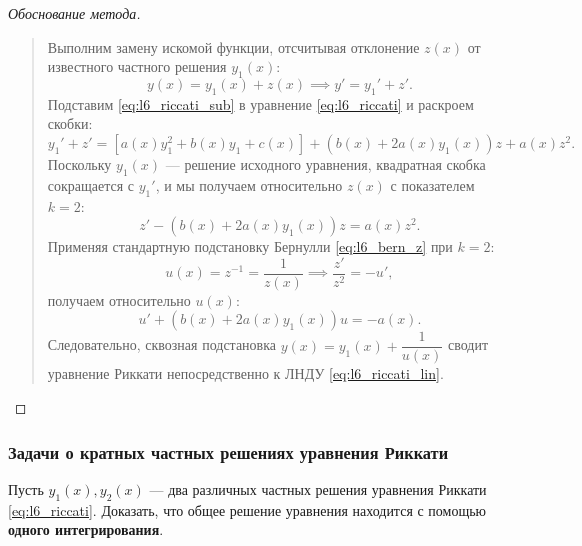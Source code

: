 \begin{proof}[Обоснование метода]~\\
    \begin{quote}
        Выполним замену искомой функции, отсчитывая отклонение $z(x)$ от
        известного частного решения $y_1(x)$:
        \begin{equation} \label{eq:l6_riccati_sub}
            y(x) = y_1(x) + z(x) \implies y' = y_1' + z'. \tag{14}
        \end{equation}
        Подставим \eqref{eq:l6_riccati_sub} в уравнение \eqref{eq:l6_riccati} и
        раскроем скобки:
        \[
            y_1' + z' = \left[a(x) y_1^2 + b(x) y_1 + c(x)\right] +
            \left(b(x) + 2 a(x) y_1(x)\right) z + a(x) z^2.
        \]
        Поскольку $y_1(x)$ — решение исходного уравнения, квадратная скобка
        сокращается с $y_1'$, и мы получаем 
        относительно $z(x)$ с показателем $k = 2$:
        \begin{equation} \label{eq:l6_riccati_bern}
            z' - \left(b(x) + 2 a(x) y_1(x)\right) z = a(x) z^2. \tag{15}
        \end{equation}
        Применяя стандартную подстановку Бернулли \eqref{eq:l6_bern_z} при
        $k = 2$:
        \begin{equation} \label{eq:l6_riccati_u}
            u(x) = z^{-1} = \frac{1}{z(x)} \implies \frac{z'}{z^2} = -u',
            \tag{16}
        \end{equation}
        получаем  относительно
        $u(x)$:
        \begin{equation} \label{eq:l6_riccati_lin}
            u' + \left(b(x) + 2 a(x) y_1(x)\right) u = -a(x). \tag{17}
        \end{equation}
        Следовательно, сквозная подстановка $y(x) = y_1(x) + \dfrac{1}{u(x)}$
        сводит уравнение Риккати непосредственно к ЛНДУ \eqref{eq:l6_riccati_lin}.
    \end{quote}
\end{proof}

\subsubsection{Задачи о кратных частных решениях уравнения Риккати}

\begin{problem}
    Пусть $y_1(x), y_2(x)$ — два различных частных решения уравнения Риккати
    \eqref{eq:l6_riccati}. Доказать, что общее решение уравнения находится с
    помощью \textbf{одного интегрирования}.
\end{problem}


